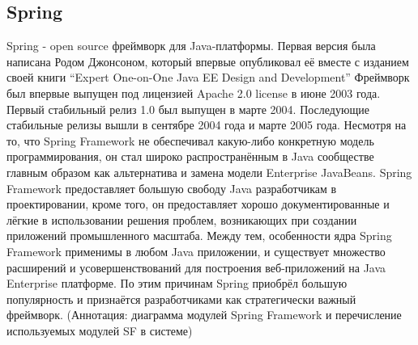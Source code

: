 \documentclass[14pt,a4paper]{reportmod}
\begin{document}
\subsection{Spring}
Spring - open source фреймворк для Java-платформы. Первая версия была написана Родом Джонсоном, который впервые опубликовал её вместе с изданием своей книги ``Expert One-on-One Java EE Design and Development''
Фреймворк был впервые выпущен под лицензией Apache 2.0 license в июне 2003 года. Первый стабильный релиз 1.0 был выпущен в марте 2004. Последующие стабильные релизы вышли в сентябре 2004 года и марте 2005 года.
Несмотря на то, что Spring Framework не обеспечивал какую-либо конкретную модель программирования, он стал широко распространённым в Java сообществе главным образом как альтернатива и замена модели Enterprise JavaBeans. Spring Framework предоставляет большую свободу Java разработчикам в проектировании, кроме того, он предоставляет хорошо документированные и лёгкие в использовании решения проблем, возникающих при создании приложений промышленного масштаба.
Между тем, особенности ядра Spring Framework применимы в любом Java приложении, и существует множество расширений и усовершенствований для построения веб-приложений на Java Enterprise платформе. По этим причинам Spring приобрёл большую популярность и признаётся разработчиками как стратегически важный фреймворк.
(Аннотация: диаграмма модулей Spring Framework и перечисление используемых модулей SF в системе)
\end{document}
